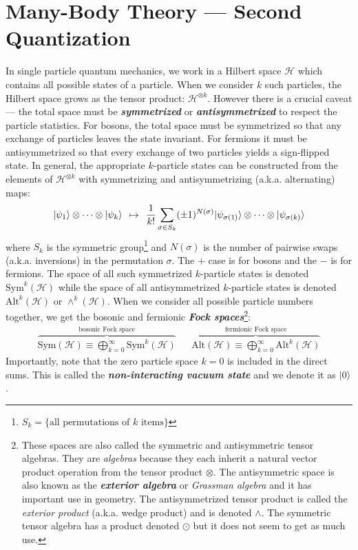 \documentclass[onecolumn]{gwclass}
\renewcommand{\t}[1]{\text{#1}}
\begin{document}
\section{Many-Body Theory --- Second Quantization}
In single particle quantum mechanics, we work in a Hilbert space $\mathscr{H}$ which contains all possible states of a particle. When we consider $k$ such particles, the Hilbert space grows as the tensor product: $\mathscr{H}^{\otimes k}$. However there is a crucial caveat --- the total space must be \textbf{\emph{symmetrized}} or \textbf{\emph{antisymmetrized}} to respect the particle statistics. For bosons, the total space must be symmetrized so that any exchange of particles leaves the state invariant. For fermions it must be antisymmetrized so that every exchange of two particles yields a sign-flipped state. In general, the appropriate $k$-particle states can be constructed from the elements of $\mathscr{H}^{\otimes k}$ with symmetrizing and antisymmetrizing (a.k.a. alternating) maps:
\begin{align*}
	\ket{\psi_1}\otimes \dots \otimes\ket{\psi_k} \:\:\mapsto\:\: \frac{1}{k!}\sum_{\sigma\in S_k} (\pm 1)^{N(\sigma)}|\psi_{\sigma(1)}\rangle \otimes \dots \otimes |\psi_{\sigma(k)}\rangle
\end{align*}
where $S_k$ is the symmetric group\footnote{$S_k= \{\t{all permutations of $k$ items}\}$} and $N(\sigma)$ is the number of pairwise swaps (a.k.a. inversions) in the permutation $\sigma$. The $+$ case is for bosons and the $-$ is for fermions. The space of all such symmetrized $k$-particle states is denoted $\t{Sym}^k(\mathscr{H})$ while the space of all antisymmetrized $k$-particle states is denoted $\t{Alt}^k(\mathscr{H})$ or $\wedge^k(\mathscr{H})$. When we consider all possible particle numbers together, we get the bosonic and fermionic \textbf{\emph{Fock spaces}}\footnote{These spaces are also called the symmetric and antisymmetric tensor algebras. They are \emph{algebras} because they each inherit a natural vector product operation from the tensor product $\otimes$. The antisymmetric space is also known as the \textbf{\emph{exterior algebra}} or \emph{Grassman algebra} and it has important use in geometry. The antisymmetrized tensor product is called the \emph{exterior product} (a.k.a. wedge product) and is denoted $\wedge$. The symmetric tensor algebra has a product denoted $\odot$ but it does not seem to get as much use.}:
\begin{align*}
	\overbrace{\t{Sym}(\mathscr{H})\equiv\bigoplus_{k=0}^\infty \t{Sym}^k(\mathscr{H})}^{\t{bosonic Fock space}} && \overbrace{\t{Alt}(\mathscr{H}) \equiv \bigoplus_{k=0}^\infty \t{Alt}^k(\mathscr{H})}^{\t{fermionic Fock space}} 
\end{align*}
Importantly, note that the zero particle space $k=0$ is included in the direct sums. This is called the \textbf{\emph{non-interacting vacuum state}} and we denote it as $\ket{0}$. 
\end{document}

